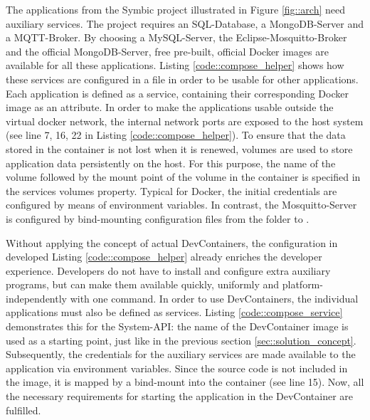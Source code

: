         The applications from the Symbic project illustrated in Figure \ref{fig::arch} need auxiliary services. The project requires an SQL-Database, a MongoDB-Server and a MQTT-Broker. By choosing a MySQL-Server, the Eclipse-Mosquitto-Broker and the official MongoDB-Server, free pre-built, official Docker images are available for all these applications. Listing \ref{code::compose_helper} shows how these services are configured in a  file in order to be usable for other applications. Each application is defined as a service, containing their corresponding Docker image as an attribute. In order to make the applications usable outside the virtual docker network, the internal network ports are exposed to the host system (see line 7, 16, 22 in Listing \ref{code::compose_helper}). To ensure that the data stored in the container is not lost when it is renewed, volumes are used to store application data persistently on the host. For this purpose, the name of the volume followed by the mount point of the volume in the container is specified in the services volumes property. Typical for Docker, the initial credentials are configured by means of environment variables. In contrast, the Mosquitto-Server is configured by bind-mounting configuration files from the  folder to .\newline
        
        Without applying the concept of actual DevContainers, the configuration in developed Listing \ref{code::compose_helper} already enriches the developer experience. Developers do not have to install and configure extra auxiliary programs, but can make them available quickly, uniformly and platform-independently with one command.\newline
        In order to use DevContainers, the individual applications must also be defined as services. Listing \ref{code::compose_service} demonstrates this for the System-\ac{API}: the name of the DevContainer image is used as a starting point, just like in the previous section \ref{sec::solution_concept}. Subsequently, the credentials for the auxiliary services are made available to the application via environment variables. Since the source code is not included in the image, it is mapped by a bind-mount into the container (see line 15). Now, all the necessary requirements for starting the application in the DevContainer are fulfilled.\newline
